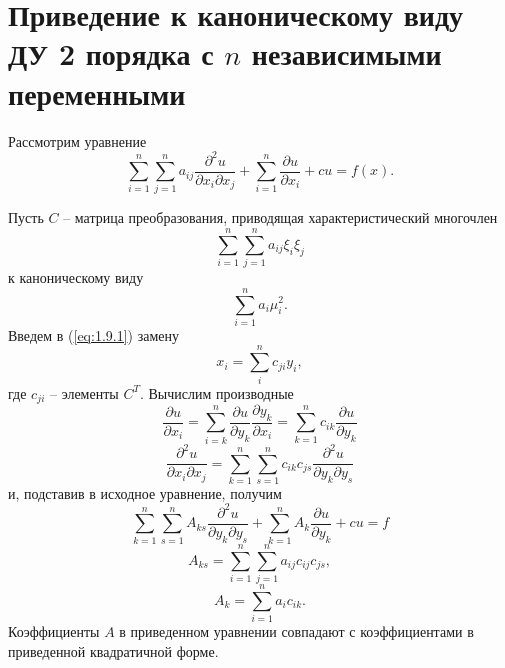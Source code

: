 \documentclass[../main.tex]{subfiles}
\begin{document}
\section{Приведение к каноническому виду ДУ 2 порядка с $n$ независимыми переменными}
Рассмотрим уравнение
\begin{equation}  \label{eq:1.9.1}
	\sum_{i=1}^n\sum_{j=1}^n a_{ij} \frac{\partial^2 u}{\partial x_i \partial x_j} + \sum_{i=1}^n \frac{\partial u}{\partial x_i} + cu = f(x).
\end{equation}

Пусть $C$ -- матрица преобразования, приводящая характеристический многочлен $$\sum_{i=1}^n\sum_{j=1}^n a_{ij} \xi_i \xi_j $$ к каноническому виду
$$\sum_{i=1}^n a_i \mu_i^2.$$
Введем в (\ref{eq:1.9.1}) замену
$$x_i = \sum_i^n c_{ji}y_i,$$
где $c_{ji}$ -- элементы $C^T$.
Вычислим производные
$$\frac{\partial u}{\partial x_i} = \sum^n_{i=k}\frac{\partial u}{\partial y_k} \frac{\partial y_k}{\partial x_i} = \sum_{k=1}^n c_{ik} \frac{\partial u}{\partial y_k}$$
$$\frac{\partial^2 u}{\partial x_i \partial x_j} = \sum^n_{k=1}\sum^n_{s=1} c_{ik} c_{js} \frac{\partial^2 u}{\partial y_k \partial y_s}$$
и, подставив в исходное уравнение, получим
\begin{equation}
	\boxed{\sum^n_{k=1}\sum^n_{s=1} A_{ks} \frac{\partial^2 u}{\partial y_k \partial y_s} + \sum_{k=1}^n A_k \frac{\partial u}{\partial y_k} + cu = f}
\end{equation}
$$A_{ks} = \sum^n_{i=1}\sum^n_{j=1} a_{ij} c_{ij} c_{js},$$
$$A_k = \sum_{i=1}^n a_i c_{ik}.$$
Коэффициенты $A$ в приведенном уравнении совпадают с коэффициентами в приведенной квадратичной форме.
\end{document}

